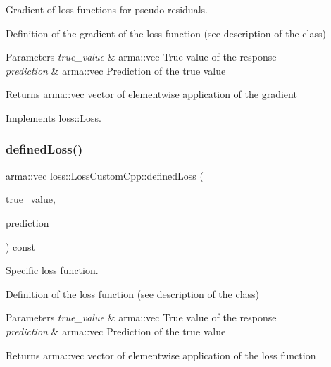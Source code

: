 Gradient of loss functions for pseudo residuals. 

Definition of the gradient of the loss function (see description of the class)


\begin{DoxyParams}{Parameters}
{\em true\+\_\+value} & {\ttfamily arma\+::vec} True value of the response \\
\hline
{\em prediction} & {\ttfamily arma\+::vec} Prediction of the true value\\
\hline
\end{DoxyParams}
\begin{DoxyReturn}{Returns}
{\ttfamily arma\+::vec} vector of elementwise application of the gradient 
\end{DoxyReturn}


Implements \hyperlink{classloss_1_1_loss_a267a4de70747ade4b2d84ce35a448979}{loss\+::\+Loss}.

\mbox{\label{classloss_1_1_loss_custom_cpp_abb0c51701c90ce115cd0a0440e5b28f8}} 
\subsubsection{\texorpdfstring{defined\+Loss()}{definedLoss()}}
{\footnotesize\ttfamily arma\+::vec loss\+::\+Loss\+Custom\+Cpp\+::defined\+Loss (\begin{DoxyParamCaption}\item[{const arma\+::vec \&}]{true\+\_\+value,  }\item[{const arma\+::vec \&}]{prediction }\end{DoxyParamCaption}) const\hspace{0.3cm}{\ttfamily [virtual]}}



Specific loss function. 

Definition of the loss function (see description of the class)


\begin{DoxyParams}{Parameters}
{\em true\+\_\+value} & {\ttfamily arma\+::vec} True value of the response \\
\hline
{\em prediction} & {\ttfamily arma\+::vec} Prediction of the true value\\
\hline
\end{DoxyParams}
\begin{DoxyReturn}{Returns}
{\ttfamily arma\+::vec} vector of elementwise application of the loss function 
\end{DoxyReturn}


